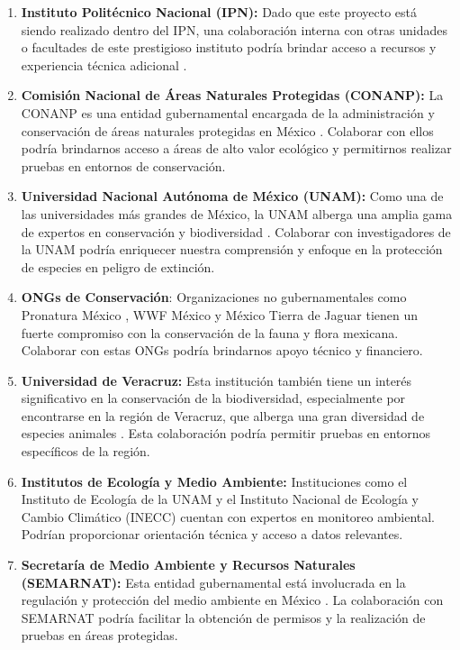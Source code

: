 \begin{enumerate}
\item \textbf{Instituto Politécnico Nacional (IPN):} Dado que este proyecto está siendo realizado dentro del IPN, una colaboración interna con otras unidades o facultades de este prestigioso instituto podría brindar acceso a recursos y experiencia técnica adicional \cite{IPN}.
\item \textbf{Comisión Nacional de Áreas Naturales Protegidas (CONANP):} La CONANP es una entidad gubernamental encargada de la administración y conservación de áreas naturales protegidas en México \cite{CONANP}. Colaborar con ellos podría brindarnos acceso a áreas de alto valor ecológico y permitirnos realizar pruebas en entornos de conservación.
\item \textbf{Universidad Nacional Autónoma de México (UNAM):} Como una de las  universidades más grandes de México, la UNAM alberga una amplia gama de expertos en conservación y biodiversidad \cite{UNAM}. Colaborar con investigadores de la UNAM podría enriquecer nuestra comprensión y enfoque en la protección de especies en peligro de extinción.

\item \textbf{ONGs de Conservación}: Organizaciones no gubernamentales como Pronatura México \cite{PronaturaMexico}, WWF México \cite{WWFMexico} y México Tierra de Jaguar \cite{MexicoTierraDeJaguar} tienen un fuerte compromiso con la conservación de la fauna y flora mexicana. Colaborar con estas ONGs podría brindarnos apoyo técnico y financiero.

\item \textbf{Universidad de Veracruz:} Esta institución también tiene un interés significativo en la conservación de la biodiversidad, especialmente por encontrarse en la región de Veracruz, que alberga una gran diversidad de especies animales \cite{UniversidadVeracruzana}. Esta colaboración podría permitir pruebas en entornos específicos de la región.

\item \textbf{Institutos de Ecología y Medio Ambiente:} Instituciones como el Instituto de Ecología de la UNAM \cite{InstitutoEcologiaUNAM} y el Instituto Nacional de Ecología y Cambio Climático (INECC) \cite{INECC} cuentan con expertos en monitoreo ambiental. Podrían proporcionar orientación técnica y acceso a datos relevantes.

\item \textbf{Secretaría de Medio Ambiente y Recursos Naturales (SEMARNAT):} Esta entidad gubernamental está involucrada en la regulación y protección del medio ambiente en México \cite{SEMARNAT}. La colaboración con SEMARNAT podría facilitar la obtención de permisos y la realización de pruebas en áreas protegidas.


\end{enumerate}
